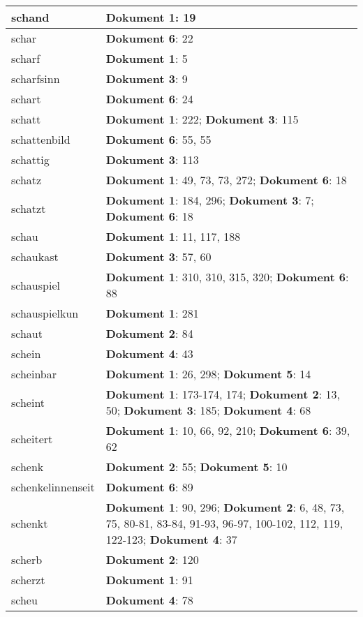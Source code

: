 \documentclass[a5paper]{article}
\begin{document}
\begin{longtable}[l]{|l|p{3in}|}
\hline
schand & \textbf{Dokument 1}: 19 \\
\hline
schar & \textbf{Dokument 6}: 22 \\
\hline
scharf & \textbf{Dokument 1}: 5 \\
\hline
scharfsinn & \textbf{Dokument 3}: 9 \\
\hline
schart & \textbf{Dokument 6}: 24 \\
\hline
schatt & \textbf{Dokument 1}: 222; \textbf{Dokument 3}: 115 \\
\hline
schattenbild & \textbf{Dokument 6}: 55, 55 \\
\hline
schattig & \textbf{Dokument 3}: 113 \\
\hline
schatz & \textbf{Dokument 1}: 49, 73, 73, 272; \textbf{Dokument 6}: 18 \\
\hline
schatzt & \textbf{Dokument 1}: 184, 296; \textbf{Dokument 3}: 7; \textbf{Dokument 6}: 18 \\
\hline
schau & \textbf{Dokument 1}: 11, 117, 188 \\
\hline
schaukast & \textbf{Dokument 3}: 57, 60 \\
\hline
schauspiel & \textbf{Dokument 1}: 310, 310, 315, 320; \textbf{Dokument 6}: 88 \\
\hline
schauspielkun & \textbf{Dokument 1}: 281 \\
\hline
schaut & \textbf{Dokument 2}: 84 \\
\hline
schein & \textbf{Dokument 4}: 43 \\
\hline
scheinbar & \textbf{Dokument 1}: 26, 298; \textbf{Dokument 5}: 14 \\
\hline
scheint & \textbf{Dokument 1}: 173-174, 174; \textbf{Dokument 2}: 13, 50; \textbf{Dokument 3}: 185; \textbf{Dokument 4}: 68 \\
\hline
scheitert & \textbf{Dokument 1}: 10, 66, 92, 210; \textbf{Dokument 6}: 39, 62 \\
\hline
schenk & \textbf{Dokument 2}: 55; \textbf{Dokument 5}: 10 \\
\hline
schenkelinnenseit & \textbf{Dokument 6}: 89 \\
\hline
schenkt & \textbf{Dokument 1}: 90, 296; \textbf{Dokument 2}: 6, 48, 73, 75, 80-81, 83-84, 91-93, 96-97, 100-102, 112, 119, 122-123; \textbf{Dokument 4}: 37 \\
\hline
scherb & \textbf{Dokument 2}: 120 \\
\hline
scherzt & \textbf{Dokument 1}: 91 \\
\hline
scheu & \textbf{Dokument 4}: 78 \\

\end{longtable}
\end{document}
